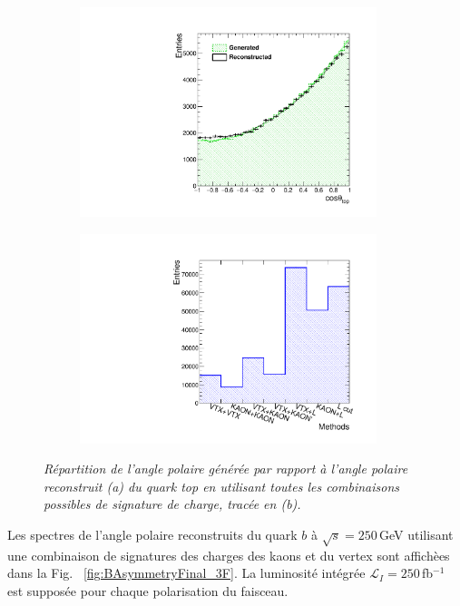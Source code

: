 \begin{figure}
	\centering
	\begin{subfigure}{0.5\textwidth}
		\includegraphics[width=0.95\textwidth]{ILD/plots/top-asymmetry-lepton.pdf}
		\caption{\label{fig:TopAsymmetryChi_a_3F} }
	\end{subfigure}%
	\begin{subfigure}{0.5\textwidth}
		\centering
		\includegraphics[width=0.95\textwidth]{ILD/plots/top-methods-lepton.pdf}
		\caption{\label{fig:TopAsymmetryChi_b_3F} }
	\end{subfigure}
	\caption{\sl Répartition de l'angle polaire générée par rapport à l'angle polaire reconstruit (a) du quark top en utilisant toutes les combinaisons possibles de signature de charge, tracée en (b).}
	\label{fig:TopAsymmetryChi_3F}
\end{figure}

Les spectres de l'angle polaire reconstruits du quark $b$ à $\sqrt{s} = 250$\,GeV utilisant une combinaison de signatures des charges des kaons et du vertex sont affich\`ees dans la Fig. ~\ref{fig:BAsymmetryFinal_3F}. La luminosité intégrée $\mathcal{L}_I=250$\,fb$^{-1}$ est supposée pour chaque polarisation du faisceau.

